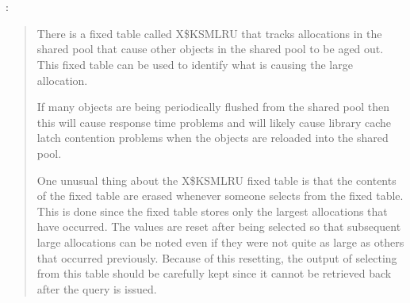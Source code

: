 \section{ \oracle}
\index{\oracle}

  :

\begin{framed}
\begin{quotation}
There is a fixed table called X\$KSMLRU that tracks allocations in the shared pool that cause other objects 
in the shared pool to be aged out. This fixed table can be used to identify what is causing the large allocation.

If many objects are being periodically flushed from the shared pool then this will cause response time problems 
and will likely cause library cache latch contention problems when the objects are reloaded into the shared pool.

One unusual thing about the X\$KSMLRU fixed table is that the contents of the fixed table are erased whenever 
someone selects from the fixed table. This is done since the fixed table stores only the largest allocations 
that have occurred. The values are reset after being selected so that subsequent large allocations can be noted 
even if they were not quite as large as others that occurred previously. Because of this resetting, the output 
of selecting from this table should be carefully kept since it cannot be retrieved back after the query is issued.
\end{quotation}
\end{framed}


